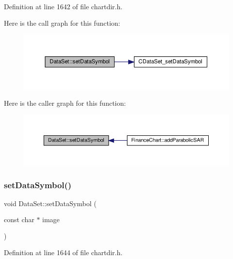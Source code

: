 Definition at line 1642 of file chartdir.\+h.

Here is the call graph for this function\+:
\nopagebreak
\begin{figure}[H]
\begin{center}
\leavevmode
\includegraphics[width=350pt]{class_data_set_aa9edb7443935eb5f07f7d70b7f65656d_cgraph}
\end{center}
\end{figure}
Here is the caller graph for this function\+:
\nopagebreak
\begin{figure}[H]
\begin{center}
\leavevmode
\includegraphics[width=350pt]{class_data_set_aa9edb7443935eb5f07f7d70b7f65656d_icgraph}
\end{center}
\end{figure}
\mbox{\label{class_data_set_ab14487760622f6bd001c2dda7bb90e95}} 
\subsubsection{\texorpdfstring{set\+Data\+Symbol()}{setDataSymbol()}\hspace{0.1cm}{\footnotesize\ttfamily [2/4]}}
{\footnotesize\ttfamily void Data\+Set\+::set\+Data\+Symbol (\begin{DoxyParamCaption}\item[{const char $\ast$}]{image }\end{DoxyParamCaption})\hspace{0.3cm}{\ttfamily [inline]}}



Definition at line 1644 of file chartdir.\+h.

